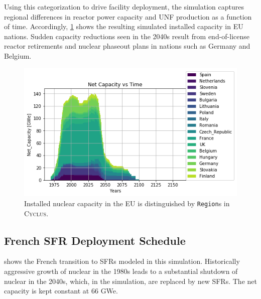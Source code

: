 \documentclass{article}
\newcommand{\Cyclus}{\textsc{Cyclus}\xspace}%
\begin{document}
\begin{table}[h]
\begin{tabular}{lll}
        \end{tabular}

Using this categorization to drive facility deployment, the simulation captures 
regional differences in reactor power capacity and \gls{UNF} production as a 
function of time. Accordingly, \cref{fig:eu_pow} shows the resulting simulated 
installed capacity in \gls{EU} nations.  Sudden capacity reductions seen in the 
2040s result from end-of-license reactor retirements and nuclear phaseout plans 
in nations such as Germany and Belgium.  
    
  \label{tab:eu_growth}
\end{table}
\FloatBarrier

\begin{figure}[htbp!]
    \begin{center}
        \includegraphics[scale=0.6]{./images/eu_future/power_plot.png}
    \end{center}
    \caption{Installed nuclear capacity in the EU is distinguished by \texttt{Region}s in \Cyclus.}
    \label{fig:eu_pow}
\end{figure}


\subsection{French \gls{SFR} Deployment Schedule}

shows
the French transition to \glspl{SFR} modeled in this simulation.
Historically aggressive growth of nuclear in the 1980s leads to a substantial 
shutdown of nuclear in the 2040s, which, in the simulation, are replaced by new 
\glspl{SFR}. The net capacity is kept constant at 66 GWe.
\end{document}
